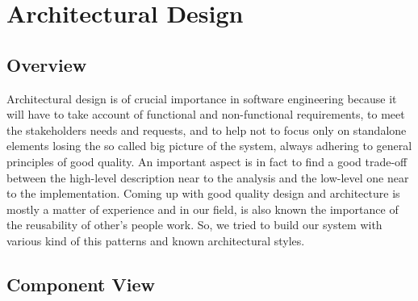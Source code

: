 %
%
\chapter{Architectural Design}
%
\label{cap:architecturaldesign}
%
%
\section{Overview}
Architectural design is of crucial importance in software engineering because it will have to take account of functional and non-functional requirements, to meet the stakeholders needs and requests, and to help not to focus only on standalone elements losing the so called big picture of the system, always adhering to general principles of good quality. An important aspect is in fact to find a good trade-off between the high-level description near to the analysis and the low-level one near to the implementation.
Coming up with good quality design and architecture is mostly a matter of experience and in our field, is also known the importance of the reusability of other’s people work. So, we tried to build our system with various kind of this patterns and known architectural styles.
%
%
\begin{landscape}
\section{Component View}
\begin{center}
\thispagestyle{empty}
\end{center}
\end{landscape}

